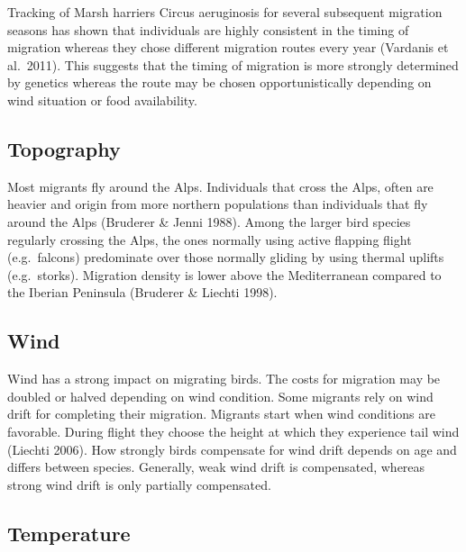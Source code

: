 \documentclass[
]{book}
\begin{document}
Tracking of Marsh harriers Circus aeruginosis for several subsequent migration seasons has shown that individuals are highly consistent in the timing of migration whereas they chose different migration routes every year (Vardanis et al.~2011). This suggests that the timing of migration is more strongly determined by genetics whereas the route may be chosen opportunistically depending on wind situation or food availability.

\hypertarget{topography}{%
\subsection{Topography}\label{topography}}

Most migrants fly around the Alps. Individuals that cross the Alps, often are heavier and origin from more northern populations than individuals that fly around the Alps (Bruderer \& Jenni 1988). Among the larger bird species regularly crossing the Alps, the ones normally using active flapping flight (e.g.~falcons) predominate over those normally gliding by using thermal uplifts (e.g.~storks).
Migration density is lower above the Mediterranean compared to the Iberian Peninsula (Bruderer \& Liechti 1998).

\hypertarget{wind}{%
\subsection{Wind}\label{wind}}

Wind has a strong impact on migrating birds. The costs for migration may be doubled or halved depending on wind condition. Some migrants rely on wind drift for completing their migration. Migrants start when wind conditions are favorable. During flight they choose the height at which they experience tail wind (Liechti 2006). How strongly birds compensate for wind drift depends on age and differs between species. Generally, weak wind drift is compensated, whereas strong wind drift is only partially compensated.

\hypertarget{temperature}{%
\subsection{Temperature}\label{temperature}}
\end{document}
